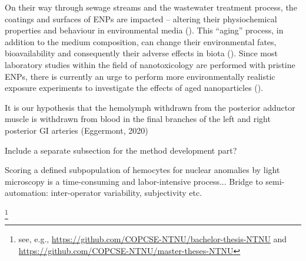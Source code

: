 On their way through sewage streams and the wastewater treatment process, the coatings and surfaces of \acrshort{ENPs} are impacted – altering their physiochemical properties and behaviour in environmental media (\cite{Kaegi2013}). This “aging” process, in addition to the medium composition, can change their environmental fates, bioavailability and consequently their adverse effects in biota (\cite{Metreveli2016, Georgantzopoulou2020}). Since most laboratory studies within the field of nanotoxicology are performed with pristine \acrshort{ENPs}, there is currently an urge to perform more environmentally realistic exposure experiments to investigate the effects of aged nanoparticles (\cite{Metreveli2016}).

It is our hypothesis that the hemolymph withdrawn from the posterior adductor muscle is withdrawn from blood in the final branches of the left and right posterior GI arteries (Eggermont, 2020)

Include a separate subsection for the method development part?

Scoring a defined subpopulation of hemocytes for nuclear anomalies by light microscopy is a time-consuming and labor-intensive process... Bridge to semi-automation: inter-operator variability, subjectivity etc.




\footnote{see, e.g., 
\url{https://github.com/COPCSE-NTNU/bachelor-thesis-NTNU} and \url{https://github.com/COPCSE-NTNU/master-theses-NTNU}}
